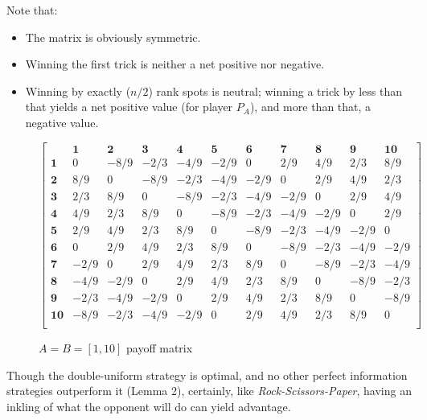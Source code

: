 \documentclass[11pt, oneside]{article} 	%
\begin{document}
Note that:

\begin{itemize}
\item The matrix is obviously symmetric.
\item Winning the first trick is neither a net positive nor negative.
\item Winning by exactly ($n/2$) rank spots is neutral; winning a trick by less than that yields a net positive value (for player $P_A$), and more than that, a negative value.
\end{itemize}
\begin{figure}
\centering
\setcounter{MaxMatrixCols}{20}

$\begin{bmatrix}
& \mathbf{1} & \mathbf{2} & \mathbf{3} & \mathbf{4} & \mathbf{5} & \mathbf{6} &\mathbf{7} & \mathbf{8} &\mathbf{9} & \mathbf{10} \\ 
\mathbf{1} & 0 & -8/9 & -2/3 & -4/9 & -2/9 & 0 & 2/9 & 4/9 & 2/3 & 8/9 \\
\mathbf{2} & 8/9 & 0 & -8/9 & -2/3 & -4/9 & -2/9 & 0 & 2/9 & 4/9 & 2/3 \\
\mathbf{3} & 2/3 & 8/9 & 0 & -8/9 & -2/3 & -4/9 & -2/9 & 0 & 2/9 & 4/9 \\
\mathbf{4} & 4/9 & 2/3 & 8/9 & 0 & -8/9 & -2/3 & -4/9 & -2/9 & 0 & 2/9 \\
\mathbf{5} & 2/9 & 4/9 & 2/3 & 8/9 & 0 & -8/9 & -2/3 & -4/9 & -2/9 & 0 \\
\mathbf{6} & 0 & 2/9 & 4/9 & 2/3 & 8/9 & 0 & -8/9 & -2/3 & -4/9 & -2/9 \\
\mathbf{7} & -2/9 & 0 & 2/9 & 4/9 & 2/3 & 8/9 & 0 & -8/9 & -2/3 & -4/9 \\
\mathbf{8} & -4/9 & -2/9 & 0 & 2/9 & 4/9 & 2/3 & 8/9 & 0 & -8/9 & -2/3 \\
\mathbf{9} & -2/3 & -4/9 & -2/9 & 0 & 2/9 & 4/9 & 2/3 & 8/9 & 0 & -8/9 \\
\mathbf{10} & -8/9 & -2/3 & -4/9 & -2/9 & 0 & 2/9 & 4/9 & 2/3 & 8/9 & 0 \\
\end{bmatrix}
$

\caption{$A = B = [1,10]$ payoff matrix}
\label{fig:236135}
\end{figure}


Though the double-uniform strategy is optimal, and no other perfect information strategies outperform it (Lemma 2), certainly, like \emph{Rock-Scissors-Paper}, having an inkling of what the opponent will do can yield advantage. 
\end{document}

